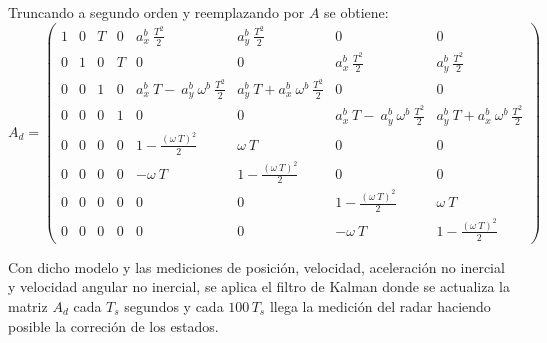 	Truncando a segundo orden y reemplazando por $A$ se obtiene:
		\begin{equation*}
			A_d = \begin{pmatrix}	1&0&T&0&a^b_x\:\frac{T^2}{2}&a^b_y\:\frac{T^2}{2}&0&0\\[0.3em]%
						0&1&0&T&0&0&a^b_x\:\frac{T^2}{2}&a^b_y\:\frac{T^2}{2}\\[0.3em]%
						0&0&1&0&a^b_x\:T-\:a^b_y\:\omega^b\:\frac{T^2}{2}&a^b_y\: T+a^b_x\:\omega^b\:\frac{T^2}{2}&0&0\\[0.3em]%
						0&0&0&1&0&0&a^b_x\:T-\:a^b_y\:\omega^b\:\frac{T^2}{2}&a^b_y\: T+a^b_x\:\omega^b\:\frac{T^2}{2}\\[0.3em]%
						0&0&0&0&1-\frac{(\omega\:T)^2}{2}&\omega\:T&0&0\\[0.3em]%
						0&0&0&0&-\omega\:T&1-\frac{(\omega\:T)^2}{2}&0&0\\[0.3em]%
						0&0&0&0&0&0&1-\frac{(\omega\:T)^2}{2}&\omega\:T\\[0.3em]%
						0&0&0&0&0&0&-\omega\:T&1-\frac{(\omega\:T)^2}{2}
		\end{pmatrix}
		\end{equation*}


		Con dicho modelo y las mediciones de posición, velocidad, aceleración no inercial y velocidad angular no inercial, se aplica el filtro de Kalman 
		donde se actualiza la matriz $A_d$ cada $T_s$ segundos y cada $100\, T_s$ llega la medición del radar haciendo posible la correción de los estados.
	
%
%	
